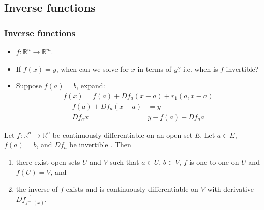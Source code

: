 \documentclass[compress]{beamer}
\def\R{\mathbb{R}}
\renewcommand{\to}{{\rightarrow}}
\begin{document}
\subsection{Inverse functions}
\begin{frame}\frametitle{Inverse functions}
  \begin{itemize}
  \item $f: \R^n \to \R^m$. 
  \item If $f(x) = y$, when can we solve
    for $x$ in terms of $y$? i.e. when is $f$ invertible? 
  \item Suppose $f(a) = b$, expand:
    \begin{align*}
      f(x) = f(a) + Df_a (x-a) + r_1(a,x-a)
    \end{align*}
    \begin{align*}
      f(a) + Df_a (x-a) & = y\\
      Df_a x = & y - f(a) + Df_a a
    \end{align*}
  \end{itemize}
\end{frame}

\begin{frame} 
  \begin{theorem}
    Let $f: \R^n \to \R^n$ be continuously differentiable on an open set
    $E$. Let $a \in E$, $f(a) = b$, and $Df_a$ be invertible . Then 
    \begin{enumerate}
    \item there exist open sets $U$ and $V$ such that $a \in U$, $b \in
      V$, $f$ is one-to-one on $U$ and $f(U) = V$, and
    \item the inverse of $f$ exists and is continuously differentiable
      on $V$ with derivative $Df_{f^{-1}(x)}^{-1}$.
    \end{enumerate}
  \end{theorem}
\end{frame}
\end{document}

